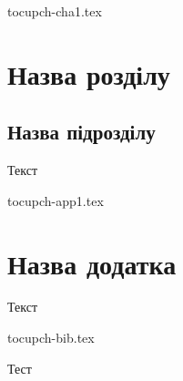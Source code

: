 





\begin{filecontents}{tocupch-cha1.tex}
\chapter{Назва розділу}
\section{Назва підрозділу}
Текст
\end{filecontents}

\begin{filecontents}{tocupch-app1.tex}
\chapter{Назва додатка}
Текст
\end{filecontents}

\begin{filecontents}{tocupch-bib.tex}
\renewcommand{\bibname}{СПИСОК ВИКОРИСТАНИХ ДЖЕРЕЛ}%
\begin{thebibliography}{9}
 Тест
\end{thebibliography}
\end{filecontents}

